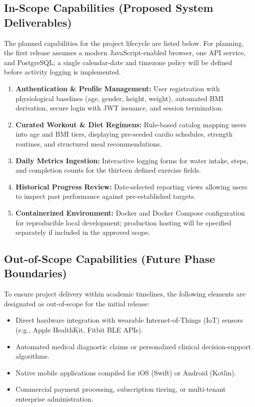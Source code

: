 \documentclass[11pt,a4paper]{report}
\begin{document}
\subsection{In-Scope Capabilities (Proposed System Deliverables)}
The planned capabilities for the project lifecycle are listed below. For planning, the first release assumes a modern JavaScript-enabled browser, one API service, and PostgreSQL; a single calendar-date and timezone policy will be defined before activity logging is implemented.
\begin{enumerate}
  \item \textbf{Authentication \& Profile Management:} User registration with physiological baselines (age, gender, height, weight), automated BMI derivation, secure login with JWT issuance, and session termination.
  \item \textbf{Curated Workout \& Diet Regimens:} Rule-based catalog mapping users into age and BMI tiers, displaying pre-seeded cardio schedules, strength routines, and structured meal recommendations.
  \item \textbf{Daily Metrics Ingestion:} Interactive logging forms for water intake, steps, and completion counts for the thirteen defined exercise fields.
  \item \textbf{Historical Progress Review:} Date-selected reporting views allowing users to inspect past performance against pre-established targets.
  \item \textbf{Containerized Environment:} Docker and Docker Compose configuration for reproducible local development; production hosting will be specified separately if included in the approved scope.
\end{enumerate}

\subsection{Out-of-Scope Capabilities (Future Phase Boundaries)}
To ensure project delivery within academic timelines, the following elements are designated as out-of-scope for the initial release:
\begin{itemize}
  \item Direct hardware integration with wearable Internet-of-Things (IoT) sensors (e.g., Apple HealthKit, Fitbit BLE APIs).
  \item Automated medical diagnostic claims or personalized clinical decision-support algorithms.
  \item Native mobile applications compiled for iOS (Swift) or Android (Kotlin).
  \item Commercial payment processing, subscription tiering, or multi-tenant enterprise administration.
\end{itemize}
\end{document}
